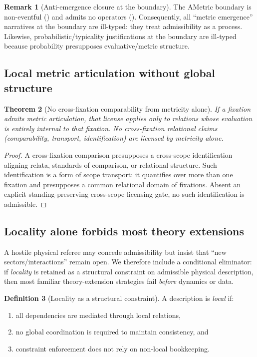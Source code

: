 \documentclass[11pt]{article}
\newtheorem{theorem}{Theorem}[section]
\theoremstyle{definition}
\newtheorem{definition}[theorem]{Definition}
\newtheorem{remark}[theorem]{Remark}
\begin{document}
\begin{remark}[Anti-emergence closure at the boundary]
The AMetric boundary is non-eventful () and admits no operators ().
Consequently, all ``metric emergence'' narratives at the boundary are ill-typed: they treat admissibility as a process.
Likewise, probabilistic/typicality justifications at the boundary are ill-typed because probability presupposes evaluative/metric structure.
\end{remark}

\subsection{Local metric articulation without global structure}

\begin{theorem}[No cross-fixation comparability from metricity alone]
\label{thm:no-cross-metric}
If a fixation admits metric articulation, that license applies only to relations whose evaluation is entirely internal to that fixation.
No cross-fixation relational claims (comparability, transport, identification) are licensed by metricity alone.
\end{theorem}

\begin{proof}
A cross-fixation comparison presupposes a cross-scope identification aligning relata, standards of comparison, or relational structure.
Such identification is a form of scope transport: it quantifies over more than one fixation and presupposes a common relational domain of fixations.
Absent an explicit standing-preserving cross-scope licensing gate, no such identification is admissible.
\end{proof}

\subsection{Locality alone forbids most theory extensions}
\label{sec:locality}

A hostile physical referee may concede admissibility but insist that ``new sectors/interactions'' remain open.
We therefore include a conditional eliminator: if \emph{locality} is retained as a structural constraint on admissible physical description, then most familiar theory-extension strategies fail \emph{before} dynamics or data.

\begin{definition}[Locality as a structural constraint]
A description is \emph{local} if:
\begin{enumerate}[label=(\roman*), leftmargin=2.0em]
\item all dependencies are mediated through local relations,
\item no global coordination is required to maintain consistency, and
\item constraint enforcement does not rely on non-local bookkeeping.
\end{enumerate}
\end{definition}
\end{document}
